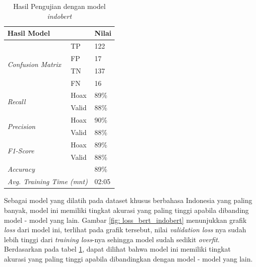 \begin{table}[h]
    \caption{Hasil Pengujian dengan model \textit{indobert}}
    \label{tab: loss_indobert}
    \centering
    \begin{tabular}{|l|l|l|}
        \hline
        \multicolumn{2}{|l|}{\textbf{Hasil Model}}              & \textbf{Nilai}        \\ \hline
        \multirow{4}{*}{\textit{Confusion Matrix}}              & TP             & 122  \\ \cline{2-3}
                                                                & FP             & 17   \\ \cline{2-3}
                                                                & TN             & 137  \\ \cline{2-3}
                                                                & FN             & 16   \\ \hline
        \multirow{2}{*}{\textit{Recall}}                        & Hoax           & 89\% \\ \cline{2-3}
                                                                & Valid          & 88\% \\ \hline
        \multirow{2}{*}{\textit{Precision}}                     & Hoax           & 90\% \\ \cline{2-3}
                                                                & Valid          & 88\% \\ \hline
        \multirow{2}{*}{\textit{F1-Score}}                      & Hoax           & 89\% \\ \cline{2-3}
                                                                & Valid          & 88\% \\ \hline
        \multicolumn{2}{|l|}{\textit{Accuracy}}                 & 89\%                  \\ \hline
        \multicolumn{2}{|l|}{\textit{Avg. Training Time (mnt)}} & 02:05                 \\ \hline
    \end{tabular}
\end{table}

Sebagai model yang dilatih pada dataset khusus berbahasa Indonesia yang paling banyak, model ini memiliki tingkat akurasi yang paling tinggi apabila dibanding model - model yang lain. Gambar \ref{fig: loss_bert_indobert} menunjukkan grafik \textit{loss} dari model ini, terlihat pada grafik tersebut, nilai \textit{validation loss} nya sudah lebih tinggi dari \textit{training loss}-nya sehingga model sudah sedikit \textit{overfit}. Berdasarkan pada tabel \ref{tab: loss_indobert}, dapat dilihat bahwa model ini memiliki tingkat akurasi yang paling tinggi apabila dibandingkan dengan model - model yang lain.

